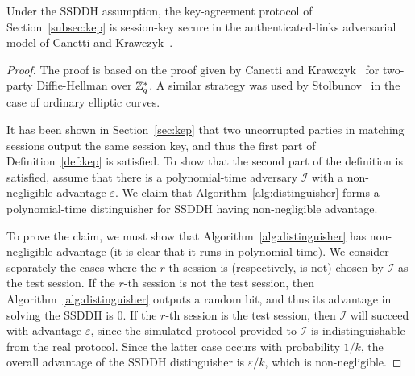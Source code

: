 \begin{theorem}
Under the SSDDH assumption, the key-agreement protocol of
Section~\ref{subsec:kep} is session-key secure in the
authenticated-links adversarial model of Canetti and
Krawczyk~\cite{canetti}.
\end{theorem}

\begin{proof}
The proof is based on the proof given by Canetti and Krawczyk~\cite[\S
  5.1]{canetti} for two-party Diffie-Hellman over ${\mathbb{Z}}_q^*$. A similar
strategy was used by Stolbunov~\cite{stolbunov-red} in the case of
ordinary elliptic curves.

It has been shown in Section~\ref{sec:kep} that two uncorrupted
parties in matching sessions output the same session key, and thus the
first part of Definition~\ref{def:kep} is satisfied. To show that the
second part of the definition is satisfied, assume that there is a
polynomial-time adversary $\mathcal{I}$ with a non-negligible advantage
$\varepsilon$. We claim that Algorithm~\ref{alg:distinguisher} forms a
polynomial-time distinguisher for SSDDH having non-negligible
advantage.

To prove the claim, we must show that
Algorithm~\ref{alg:distinguisher} has non-negligible advantage (it is
clear that it runs in polynomial time). We consider separately the
cases where the $r$-th session is (respectively, is not) chosen by
$\mathcal{I}$ as the test session. If the $r$-th session is not the
test session, then Algorithm~\ref{alg:distinguisher} outputs a random
bit, and thus its advantage in solving the SSDDH is $0$. If the
$r$-th session is the test session, then $\mathcal{I}$ will succeed
with advantage $\varepsilon$, since the simulated protocol provided to
$\mathcal{I}$ is indistinguishable from the real protocol. Since the
latter case occurs with probability $1/k$, the overall advantage of
the SSDDH distinguisher is $\varepsilon/k$, which is non-negligible.
\end{proof}

